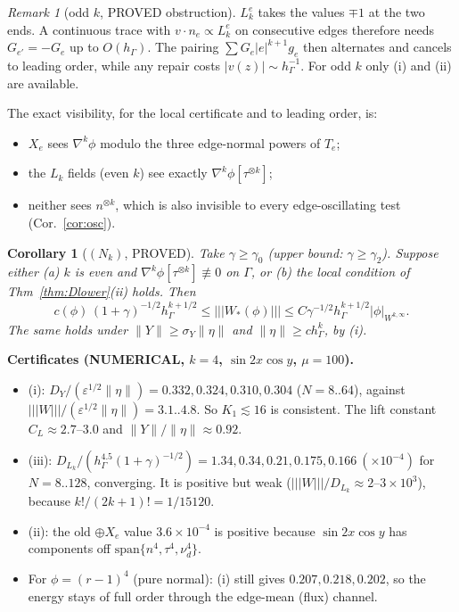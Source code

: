 \documentclass[11pt]{article}
\newtheorem{corollary}[theorem]{Corollary}
\theoremstyle{remark}
\newtheorem{remark}[theorem]{Remark}
\newcommand{\tn}[1]{|\!|\!|#1|\!|\!|}
\newcommand{\hG}{h_\Gamma}
\begin{document}
\begin{remark}[odd $k$, PROVED obstruction]
$L_k^e$ takes the values $\mp1$ at the two ends. A continuous trace with $v\cdot n_e\propto L_k^e$ on consecutive edges
therefore needs $G_{e'}=-G_e$ up to $O(\hG)$. The pairing $\sum G_e|e|^{k+1}g_e$ then alternates and cancels to leading order,
while any repair costs $|v(z)|\sim\hG^{-1}$. For odd $k$ only (i) and (ii) are available.

The exact visibility, for the local certificate and to leading order, is:
\begin{itemize}
\item $X_e$ sees $\nabla^k\phi$ modulo the three edge-normal powers of $T_e$;
\item the $L_k$ fields (even $k$) see exactly $\nabla^k\phi[\tau^{\otimes k}]$;
\item neither sees $n^{\otimes k}$, which is also invisible to every edge-oscillating test (Cor.~\ref{cor:osc}).
\end{itemize}
\end{remark}

\begin{corollary}[$(N_k)$, PROVED]
Take $\gamma\ge\gamma_0$ (upper bound: $\gamma\ge\gamma_2$). Suppose either (a) $k$ is even and
$\nabla^k\phi[\tau^{\otimes k}]\not\equiv0$ on $\Gamma$, or (b) the local condition of Thm~\ref{thm:Dlower}(ii) holds. Then
\[
c(\phi)\,(1+\gamma)^{-1/2}\hG^{k+1/2}\le\tn{W_\ast(\phi)}\le C\gamma^{-1/2}\hG^{k+1/2}|\phi|_{W^{k,\infty}}.
\]
The same holds under $\|Y\|\ge\sigma_Y\|\eta\|$ and $\|\eta\|\ge c\hG^k$, by (i).
\end{corollary}

\noindent\textbf{Certificates (NUMERICAL, $k=4$, $\sin2x\cos y$, $\mu=100$).}
\begin{itemize}
\item (i): $D_Y/(\varepsilon^{1/2}\|\eta\|)=0.332,0.324,0.310,0.304$ ($N=8..64$), against
$\tn W/(\varepsilon^{1/2}\|\eta\|)=3.1..4.8$. So $K_1\lesssim16$ is consistent. The lift constant $C_L\approx2.7$--$3.0$ and
$\|Y\|/\|\eta\|\approx0.92$.
\item (iii): $D_{L_k}/(\hG^{4.5}(1+\gamma)^{-1/2})=1.34,0.34,0.21,0.175,0.166\ (\times10^{-4})$ for $N=8..128$, converging.
It is positive but weak ($\tn W/D_{L_k}\approx2\text{--}3\times10^3$), because $k!/(2k+1)!=1/15120$.
\item (ii): the old $\oplus X_e$ value $3.6\times10^{-4}$ is positive because $\sin2x\cos y$ has components off
$\mathrm{span}\{n^4,\tau^4,\nu_d^4\}$.
\item For $\phi=(r-1)^4$ (pure normal): (i) still gives $0.207,0.218,0.202$, so the energy stays of full order through the
edge-mean (flux) channel.
\end{itemize}
\end{document}
